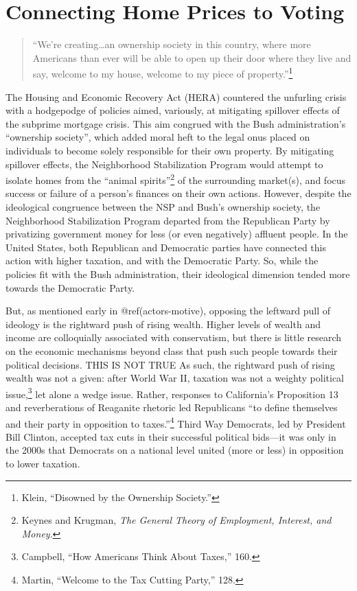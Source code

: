 \documentclass[
]{article}
\date{}
\let\rmarkdownfootnote\footnote%
\def\footnote{\protect\rmarkdownfootnote}
\begin{document}
\hypertarget{motive-opportunity}{%
\section{Connecting Home Prices to Voting}\label{motive-opportunity}}

\begin{quote}
``We're creating\ldots an ownership society in this country, where more
Americans than ever will be able to open up their door where they live
and say, welcome to my house, welcome to my piece of
property.''\footnote{Klein, ``Disowned by the Ownership Society.''}
\end{quote}

The Housing and Economic Recovery Act (HERA) countered the unfurling
crisis with a hodgepodge of policies aimed, variously, at mitigating
spillover effects of the subprime mortgage crisis. This aim congrued
with the Bush administration's ``ownership society'', which added moral
heft to the legal onus placed on individuals to become solely
responsible for their own property. By mitigating spillover effects, the
Neighborhood Stabilization Program would attempt to isolate homes from
the ``animal spirits''\footnote{Keynes and Krugman, \emph{The General
  Theory of Employment, Interest, and Money}.} of the surrounding
market(s), and focus success or failure of a person's finances on their
own actions. However, despite the ideological congruence between the NSP
and Bush's ownership society, the Neighborhood Stabilization Program
departed from the Republican Party by privatizing government money for
less (or even negatively) affluent people. In the United States, both
Republican and Democratic parties have connected this action with higher
taxation, and with the Democratic Party. So, while the policies fit with
the Bush administration, their ideological dimension tended more towards
the Democratic Party.

But, as mentioned early in @ref(actors-motive), opposing the leftward
pull of ideology is the rightward push of rising wealth. Higher levels
of wealth and income are colloquially associated with conservatism, but
there is little research on the economic mechanisms beyond class that
push such people towards their political decisions. THIS IS NOT TRUE As
such, the rightward push of rising wealth was not a given: after World
War II, taxation was not a weighty political issue,\footnote{Campbell,
  ``How Americans Think About Taxes,'' 160.} let alone a wedge issue.
Rather, responses to California's Proposition 13 and reverberations of
Reaganite rhetoric led Republicans ``to define themselves and their
party in opposition to taxes.''\footnote{Martin, ``Welcome to the Tax
  Cutting Party,'' 128.} Third Way Democrats, led by President Bill
Clinton, accepted tax cuts in their successful political bids---it was
only in the 2000s that Democrats on a national level united (more or
less) in opposition to lower taxation.
\end{document}
